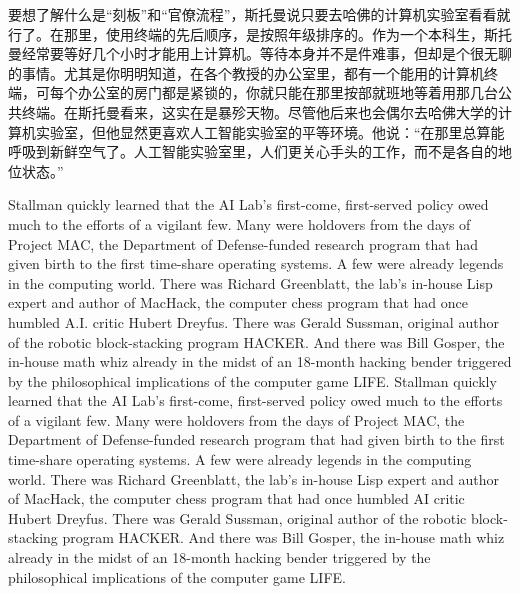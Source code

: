 \ifdefined\chs
要想了解什么是``刻板''和``官僚流程''，斯托曼说只要去哈佛的计算机实验室看看就行了。在那里，使用终端的先后顺序，是按照年级排序的。作为一个本科生，斯托曼经常要等好几个小时才能用上计算机。等待本身并不是件难事，但却是个很无聊的事情。尤其是你明明知道，在各个教授的办公室里，都有一个能用的计算机终端，可每个办公室的房门都是紧锁的，你就只能在那里按部就班地等着用那几台公共终端。在斯托曼看来，这实在是暴殄天物。尽管他后来也会偶尔去哈佛大学的计算机实验室，但他显然更喜欢人工智能实验室的平等环境。他说：``在那里总算能呼吸到新鲜空气了。人工智能实验室里，人们更关心手头的工作，而不是各自的地位状态。''
\fi

\ifdefined\eng
\ifdefined\vone
Stallman quickly learned that the AI Lab's first-come, first-served policy owed much to the efforts of a vigilant few. Many were holdovers from the days of Project MAC, the Department of Defense-funded research program that had given birth to the first time-share operating systems. A few were already legends in the computing world. There was Richard Greenblatt, the lab's in-house Lisp expert and author of MacHack, the computer chess program that had once humbled A.I. critic Hubert Dreyfus. There was Gerald Sussman, original author of the robotic block-stacking program HACKER. And there was Bill Gosper, the in-house math whiz already in the midst of an 18-month hacking bender triggered by the philosophical implications of the computer game LIFE.
\fi
\ifdefined\vtwo
Stallman quickly learned that the AI Lab's first-come, first-served policy owed much to the efforts of a vigilant few. Many were holdovers from the days of Project MAC, the Department of Defense-funded research program that had given birth to the first time-share operating systems. A few were already legends in the computing world. There was Richard Greenblatt, the lab's in-house Lisp expert and author of MacHack, the computer chess program that had once humbled AI critic Hubert Dreyfus. There was Gerald Sussman, original author of the robotic block-stacking program HACKER. And there was Bill Gosper, the in-house math whiz already in the midst of an 18-month hacking bender triggered by the philosophical implications of the computer game LIFE.
\fi
\fi

